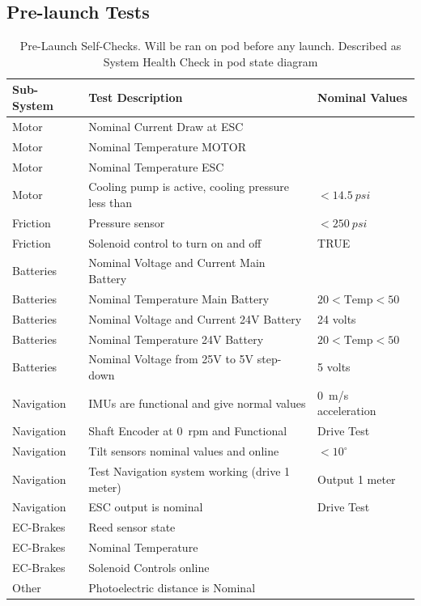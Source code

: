 \subsection{Pre-launch Tests}
\begin{table}[H]
	\centering
	\begin{tabular}{@{}lll@{}} \toprule
    Sub-System & Test Description & Nominal Values \\ \midrule
    Motor & Nominal Current Draw at ESC & \\
    Motor & Nominal Temperature MOTOR & \\
    Motor & Nominal Temperature ESC & \\
    Motor & Cooling pump is active, cooling pressure less than & $< \SI{14.5}{psi}$ \\
    Friction & Pressure sensor & $< \SI{250}{psi}$ \\
    Friction & Solenoid control to turn on and off & TRUE \\
    Batteries & Nominal Voltage and Current Main Battery & \\
    Batteries & Nominal Temperature Main Battery & $20 < \textrm{Temp} < 50$ \\
    Batteries & Nominal Voltage and Current 24V Battery & 24 volts \\
    Batteries & Nominal Temperature 24V Battery & $20 < \textrm{Temp} < 50$ \\
   	Batteries & Nominal Voltage from 25V to 5V step-down & 5 volts \\
    Navigation & IMUs are functional and give normal values  & \SI{0}{m/s} acceleration \\
    Navigation & Shaft Encoder at \SI{0}{rpm} and Functional & Drive Test \\
    Navigation & Tilt sensors nominal values and online & $< 10 ^\circ$ \\
    Navigation & Test Navigation system working (drive 1 meter) & Output 1 meter \\
    Navigation & ESC output is nominal & Drive Test \\
    EC-Brakes & Reed sensor state & \\
    EC-Brakes & Nominal Temperature & \\
    EC-Brakes & Solenoid Controls online & \\
    Other & Photoelectric distance is Nominal & \\ \bottomrule
    \end{tabular}
	\caption{Pre-Launch Self-Checks. Will be ran on pod before any launch. Described as System Health Check in pod state diagram }
    \label{tlb:prelaunch-tests}
\end{table}

